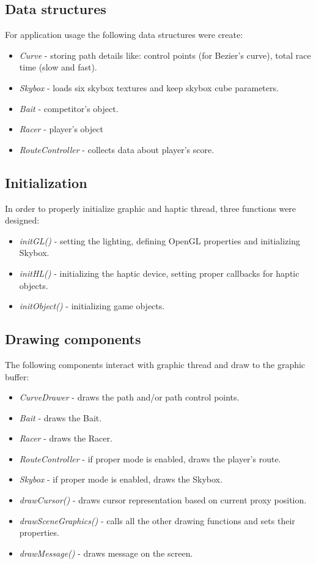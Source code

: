 \subsection{Data structures}
For application usage the following data structures were create:
\begin{itemize} [noitemsep]
\item \emph{Curve} - storing path details like: control points (for Bezier's curve), total race time (slow and fast).
\item \emph{Skybox} - loads six skybox textures and keep skybox cube parameters.
\item \emph{Bait} - competitor's object.
\item \emph{Racer} - player's object
\item \emph{RouteController} - collects data about player's score.
\end{itemize}

\subsection{Initialization} 
In order to properly initialize graphic and haptic thread, three functions were designed:
\begin{itemize} [noitemsep]
\item \emph{initGL()} - setting the lighting, defining OpenGL properties and initializing Skybox.
\item \emph{initHL()} - initializing the haptic device, setting proper callbacks for haptic objects.
\item \emph{initObject()} - initializing game objects.
\end{itemize}

\subsection{Drawing components}
\label{drawing_components}
The following components interact with graphic thread and draw to the graphic buffer:
\begin{itemize} [noitemsep]
\item \emph{CurveDrawer} - draws the path and/or path control points.
\item \emph{Bait} - draws the Bait.
\item \emph{Racer} - draws the Racer.
\item \emph{RouteController} - if proper mode is enabled, draws the player's route.
\item \emph{Skybox} - if proper mode is enabled, draws the Skybox.
\item \emph{drawCursor()} - draws cursor representation based on current proxy position.
\item \emph{drawSceneGraphics()} - calls all the other drawing functions and sets their properties.
\item \emph{drawMessage()} - draws message on the screen.
\end{itemize}

